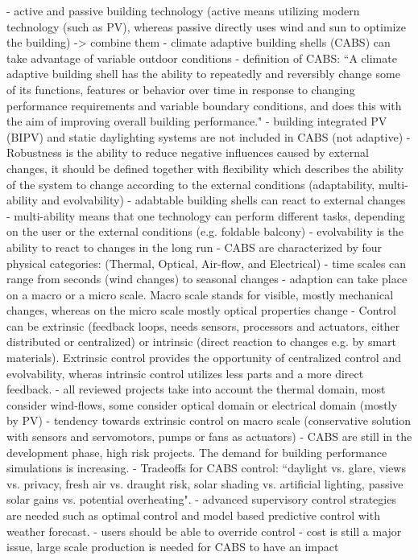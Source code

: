 	-  active and passive building technology (active means utilizing modern technology (such as PV), whereas passive directly uses wind and sun to optimize the building) -> combine them
	- climate adaptive building shells (CABS) can take advantage of variable outdoor conditions
	- definition of CABS: ``A climate adaptive building shell has the ability to repeatedly and reversibly change some of its functions, features or behavior over time in response to changing performance requirements and variable boundary conditions, and does this with the aim of improving overall building performance."
	- building integrated PV (BIPV) and static daylighting systems are not included in CABS (not adaptive)
	- Robustness is the ability to reduce negative influences caused by external changes, it should be defined together with flexibility which describes the ability of the system to change according to the external conditions (adaptability, multi-ability and evolvability)
	- adabtable building shells can react to external changes
	- multi-ability means that one technology can perform different tasks, depending on the user or the external conditions (e.g. foldable balcony)
	- evolvability is the ability to react to changes in the long run
	- CABS are characterized by four physical categories: (Thermal, Optical, Air-flow, and Electrical)
	- time scales can range from seconds (wind changes) to seasonal changes
	- adaption can take place on a macro or a micro scale. Macro scale stands for visible, mostly mechanical changes, whereas on the micro scale mostly optical properties change
	- Control can be extrinsic (feedback loops, needs sensors, processors and actuators, either distributed or centralized) or intrinsic (direct reaction to changes e.g. by smart materials). Extrinsic control provides the opportunity of centralized control and evolvability, wheras intrinsic control utilizes less parts and a more direct feedback.  
	- all reviewed projects take into account the thermal domain, most consider wind-flows, some consider optical domain or electrical domain (mostly by PV)
	- tendency towards extrinsic control on macro scale (conservative solution with sensors and servomotors, pumps or fans as actuators)
	- CABS are still in the development phase, high risk projects. The demand for building performance simulations is increasing. 
	- Tradeoffs for CABS control: ``daylight vs. glare, views vs. privacy, fresh air vs. draught risk, solar shading vs. artificial lighting, passive solar gains vs. potential overheating". 
	- advanced supervisory control strategies are needed such as optimal control and model based predictive control with weather forecast. 
	- users should be able to override control
	- cost is still a major issue, large scale production is needed for CABS to have an impact\\



